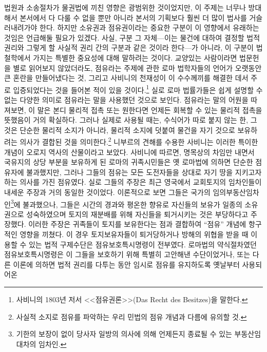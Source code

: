 법원과 소송절차가 물권법에 끼친 영향은 광범위한 것이었지만,
이 주제는 너무나 방대해서 본서에서 다 다룰 수 없을 뿐만 아니라
본서의 기획보다 훨씬 더 많이 법사를 거슬러내려가야 한다.
하지만 소유권과 점유권이라는 중요한 구분이 이 영향에서
유래하는 것임은 언급해둘 필요가 있겠다.
사실, 구분 그 자체---이는
물건에 대하여 결정할 법적 권리와
그렇게 할 사실적 권리 간의 구분과
같은 것이라 한다---가 아니라,
이 구분이 법철학에서 가지는 특별한 중요성에 대해 말하려는 것이다.
교양있는 사람이라면 법문헌을 별로 읽어보지 않았더라도,
점유라는 주제에 관한
로마 법학자들의 언어가 오랫동안 큰 혼란을 만들어냈다는 것,
그리고 사비니의 천재성이 이 수수께끼를 해결한 데서
주로 입증되었다는 것을
들어본 적이 있을 것이다.\footnote{%
  사비니의 1803년 저서 <<점유권론>>(Das Recht des Besitzes)을 말한다. }
실로 로마 법률가들은
쉽게 설명할 수 없는 다양한 의미로
점유라는 말을
사용했던 것으로 보인다.
점유라는 말의 어원을 따져보면, 이 말은 본디
물리적 접촉 또는
원한다면 언제든 회복할 수 있는 물리적 접촉을 뜻했음이 거의 확실하다.
그러나 실제로 사용될 때는,
수식어가 따로 붙지 않는 한,
그것은 단순한 물리적 소지가 아니라,
물리적 소지에 덧붙여
물건을 자기 것으로 보유하려는 의사가 결합된 것을
의미한다.\footnote{%
  사실적 소지로 점유를 파악하는 우리 민법의 점유 개념과 다름에 유의할 것.
  }
니부르의 견해를 수용한 사비니는
이러한 특이한 개념이 오로지 역사의 산물이라고 보았다.
사비니에 따르면,
명목상의 차임만 내면서
국유지의 상당 부분을
보유하게 된
로마의 귀족시민들은
옛 로마법에 의하면 단순한 점유자에
불과했지만, 그러나
그들의 점유는
모든 도전자들을 상대로 자기 땅을 지키고자 하는 의사를 가진 점유였다.
실로 그들의 주장은 최근 영국에서 교회토지의 임차인들이 내세운 주장과
거의 동일한 것이었다.
이론적으로 보면 그들은 국가의
임의부동산임차인\footnote{%
  기한의 보장이 없이
  당사자 일방의 의사에 의해 언제든지 종료될 수 있는 부동산임대차의 임차인.
}에 불과했으나,
그들은 시간의 경과와 평온한 향유로
자신들의 보유가 일종의 소유권으로 성숙하였으며
토지의 재분배를 위해 자신들을 퇴거시키는 것은 부당하다고 주장했다.
이러한 주장은 귀족들이 토지를 보유한다는 점과 결합하여
``점유'' 개념에 항구적인 영향을 끼쳤다.
이 경우
토지보유자들이
퇴거당하거나 방해의 위협을 받을 때
이용할 수 있는 법적 구제수단은
점유보호특시명령이 전부였다.
로마법의 약식절차였던 점유보호특시명령은
이 그들을 보호하기 위해 특별히 고안해낸 수단이었거나,
또는 다른 이론에 의하면
법적 권리를 다투는 동안 임시로 점유를 유지하도록 옛날부터 사용되어온
